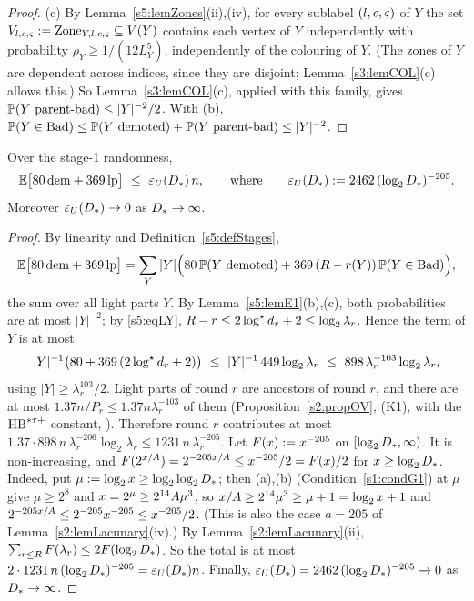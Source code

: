 \begin{proof}
(c) By Lemma~\ref{s5:lemZones}(ii),(iv), for every sublabel $(l,c,\varsigma)$ of $Y$ the set $V_{l,c,\varsigma}\mathrel{:=}\mathrm{Zone}_{Y,l,c,\varsigma}\subseteq V(Y)$ contains each vertex of $Y$ independently with probability $\rho_Y\ge 1/(12L_Y^5)$, independently of the colouring of $Y$. (The zones of $Y$ are dependent across indices, since they are disjoint; Lemma~\ref{s3:lemCOL}(c) allows this.) So Lemma~\ref{s3:lemCOL}(c), applied with this family, gives $\mathbb{P}(Y\text{ parent-bad})\le|Y|^{-2}/2$. With (b), $\mathbb{P}(Y\in\mathrm{Bad})\le\mathbb{P}(Y\text{ demoted})+\mathbb{P}(Y\text{ parent-bad})\le|Y|^{-2}$.
\end{proof}

\begin{lemma}\label{s5:lemExpect}
Over the stage-1 randomness,
\[
\Ex\bigl[\cVX\,\mathrm{dem}+\cPV\,\mathrm{lp}\bigr]\ \le\ \epsU(\Dstar)\,n,\qquad\text{where}\qquad \epsU(\Dstar)\defeq 2462\,(\log_2\Dstar)^{-205}.
\]
Moreover $\varepsilon_{U}(D_{*})\to0$ as $D_{*}\to\infty$.
\deps{\ref{s5:lemE1}, \ref{s5:defStages}, \ref{s2:propOV}, \ref{s2:lemTower}, \ref{s2:lemLacunary}, \ref{s1:condG1}, \ref{s2:propStructure}}
\end{lemma}

\begin{proof}
By linearity and Definition~\ref{s5:defStages},
\[
\mathbb{E}\bigl[80\,\mathrm{dem}+369\,\mathrm{lp}\bigr]=\sum_{Y}|Y|\Bigl(80\,\mathbb{P}(Y\text{ demoted})+369\,(R-r(Y))\,\mathbb{P}(Y\in\mathrm{Bad})\Bigr),
\]
the sum over all light parts $Y$. By Lemma~\ref{s5:lemE1}(b),(c), both probabilities are at most $|Y|^{-2}$; by \eqref{s5:eqLY}, $R-r\le 2\log^{\star} d_r+2\le\log_2\lambda_r$. Hence the term of $Y$ is at most
\[
|Y|^{-1}\bigl(80+369\,(2\logs d_r+2)\bigr)\ \le\ |Y|^{-1}\,449\log_2\lambda_r\ \le\ 898\,\lambda_r^{-103}\log_2\lambda_r ,
\]
using $|Y|\ge\lambda_r^{103}/2$. Light parts of round $r$ are ancestors of round $r$, and there are at most $1.37n/P_r\le 1.37n\lambda_r^{-103}$ of them (Proposition~\ref{s2:propOV}, (K1), with the $\mathrm{HB}^{*\tau{+}}$ constant, ). Therefore round $r$ contributes at most $1.37\cdot898\,n\,\lambda_r^{-206}\log_2\lambda_r\le 1231\,n\,\lambda_r^{-205}$. Let $F(x)\mathrel{:=} x^{-205}$ on $[\log_2D_{*},\infty)$. It is non-increasing, and $F(2^{x/A})=2^{-205x/A}\le x^{-205}/2=F(x)/2$ for $x\ge\log_2D_{*}$. Indeed, put $\mu\mathrel{:=}\log_2x\ge\log_2\log_2D_{*}$; then (a),(b) (Condition~\ref{s1:condG1}) at $\mu$ give $\mu\ge2^8$ and $x=2^\mu\ge2^{14}A\mu^3$, so $x/A\ge2^{14}\mu^3\ge\mu+1=\log_2x+1$ and $2^{-205x/A}\le2^{-205}x^{-205}\le x^{-205}/2$. (This is also the case $a=205$ of Lemma~\ref{s2:lemLacunary}(iv).) By Lemma~\ref{s2:lemLacunary}(ii), $\sum_{r\le R}F(\lambda_r)\le 2F(\log_2D_{*})$. So the total is at most $2\cdot1231\,n\,(\log_2D_{*})^{-205}=\varepsilon_{U}(D_{*})n$. Finally, $\varepsilon_{U}(D_{*})=2462\,(\log_2D_{*})^{-205}\to0$ as $D_{*}\to\infty$.
\end{proof}


